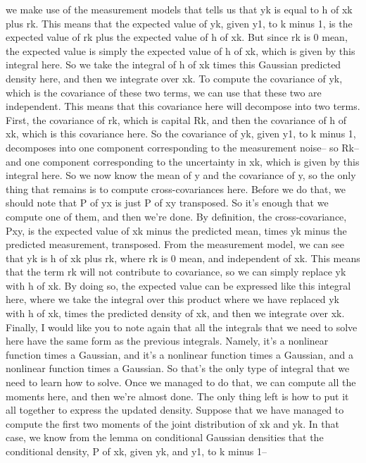 we make use of the measurement models
that tells us that yk is equal to h of xk plus rk.
This means that the expected value of yk,
given y1, to k minus 1, is the expected value of rk
plus the expected value of h of xk.
But since rk is 0 mean, the expected value
is simply the expected value of h of xk, which
is given by this integral here.
So we take the integral of h of xk times
this Gaussian predicted density here,
and then we integrate over xk.
To compute the covariance of yk, which
is the covariance of these two terms,
we can use that these two are independent.
This means that this covariance here
will decompose into two terms.
First, the covariance of rk, which is capital Rk, and then
the covariance of h of xk, which is this covariance here.
So the covariance of yk, given y1, to k minus 1,
decomposes into one component corresponding
to the measurement noise-- so Rk--
and one component corresponding to the uncertainty in xk, which
is given by this integral here.
So we now know the mean of y and the covariance of y,
so the only thing that remains is to compute cross-covariances
here.
Before we do that, we should note that P of yx
is just P of xy transposed.
So it's enough that we compute one of them,
and then we're done.
By definition, the cross-covariance, Pxy,
is the expected value of xk minus the predicted mean,
times yk minus the predicted measurement, transposed.
From the measurement model, we can
see that yk is h of xk plus rk, where rk is
0 mean, and independent of xk.
This means that the term rk will not contribute to covariance,
so we can simply replace yk with h of xk.
By doing so, the expected value can
be expressed like this integral here,
where we take the integral over this product
where we have replaced yk with h of xk,
times the predicted density of xk,
and then we integrate over xk.
Finally, I would like you to note again
that all the integrals that we need to solve here
have the same form as the previous integrals.
Namely, it's a nonlinear function times a Gaussian,
and it's a nonlinear function times a Gaussian,
and a nonlinear function times a Gaussian.
So that's the only type of integral
that we need to learn how to solve.
Once we managed to do that, we can compute all the moments
here, and then we're almost done.
The only thing left is how to put it all together
to express the updated density.
Suppose that we have managed to compute the first two
moments of the joint distribution of xk and yk.
In that case, we know from the lemma on conditional Gaussian
densities that the conditional density, P of xk,
given yk, and y1, to k minus 1--
